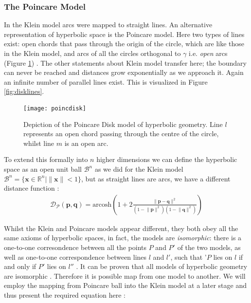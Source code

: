 \documentclass[12pt]{report}
\begin{document}
\subsubsection{The Poincare Model}
In the Klein model arcs were mapped to straight lines. An alternative representation of hyperbolic space is the Poincare model. Here two types of lines exist: open chords that pass through the origin of the circle, which are like those in the Klein model, and arcs of all the circles orthogonal to $\gamma$ i.e. \textit{open} arcs (Figure \ref{fig:pdisk}) \cite{Greenberg1994}. The other statements about Klein model transfer here; the boundary can never be reached and distances grow exponentially as we approach it. Again an infinite number of parallel lines exist. This is visualized in Figure \ref{fig:disklines}.

\begin{figure}
  \centering
	\texttt{[image: poincdisk]}
	\caption{Depiction of the Poincare Disk model of hyperbolic geometry. Line $l$ represents an open chord passing through the centre of the circle, whilst line $m$ is an open arc.}
	\label{fig:pdisk}
\end{figure}

To extend this formally into $n$ higher dimensions we can define the hyperbolic space as an open unit ball $\mathcal{B}^n$ as we did for the Klein model $\mathcal{B}^n = \{\mathbf{x} \in \mathbb{R}^n | \lVert \mathbf{x} \rVert <1 \}$, but as straight lines are arcs, we have a different distance function \cite{Iversen1992}:
\begin{align}
  \mathcal{D_P}(\mathbf{p}, \mathbf{q}) = \text{arcosh} \left(1 + 2 \frac{\lVert \mathbf{p} - \mathbf{q} \rVert^2}{(1-\lVert \mathbf{p}\rVert^2)(1-\lVert \mathbf{q}\rVert^2)}   \right) 
  \label{eq:pdist}
\end{align}

Whilst the Klein and Poincare models appear different, they both obey all the same axioms of hyperbolic spaces, in fact, the models are \textit{isomorphic}: there is a one-to-one corresondence between all the points $P$ and $P'$ of the two models, as well as one-to-one correspondence between lines $l$ and $l'$, such that '$P$ lies on $l$ if and only if $P'$ lies on $l''$ \cite{Greenberg1994}. It can be proven that all models of hyperbolic geometry are isomorphic \cite{Greenberg1994}. Therefore it is possible map from one model to another. We will employ the mapping from Poincare ball into the Klein model at a later stage and thus present the required equation here \cite{Greenberg1994}:
\end{document}
